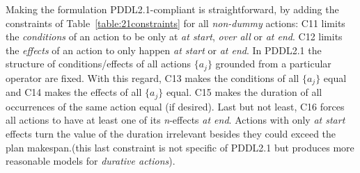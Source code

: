 \documentclass{ecai}
\begin{document}
Making the formulation PDDL2.1-compliant is straightforward, by adding the constraints of Table~\ref{table:21constraints} for all {\em non-dummy} actions: C11 limits the {\em conditions} of an action to be only at \emph{at start}, \emph{over all} or \emph{at end}. C12 limits the {\em effects} of an action to only happen \emph{at start} or \emph{at end}. In PDDL2.1 the structure of conditions/effects of all actions $\{a_j\}$ grounded from a particular operator are fixed. With this regard, C13 makes the conditions of all $\{a_j\}$ equal and C14 makes the effects of all $\{a_j\}$ equal. C15 makes the duration of all occurrences of the same action equal (if desired). Last but not least, C16 forces all actions to have at least one of its \textit{n}-effects \textit{at end}. Actions with only \textit{at start} effects turn the value of the duration irrelevant besides they could exceed the plan makespan.(this last constraint is not specific of PDDL2.1 but produces more reasonable models for {\em durative actions}).
\end{document}
